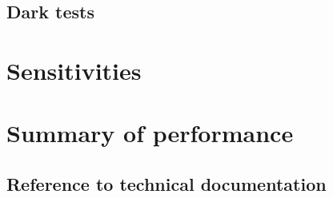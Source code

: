 \documentclass[a4paper, 11pt]{article} %
\begin{document}
\subsection{Dark tests}
\label{se:dark}



\section{Sensitivities}
\label{se:nefd}



\section{Summary of performance}
\label{se:summary}


\begin{appendix}

\section{Reference to technical documentation}
\label{ap:doc}


\end{appendix}






\end{document}
